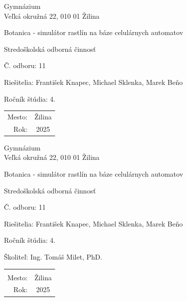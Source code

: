 \documentclass[12pt]{article}
\def\nazovprace{Botanica - simulátor rastlín na báze celulárnych automatov}
\def\autori{František Knapec, Michael Sklenka, Marek Beňo}
\begin{document}
\begin{titlepage}
	\setlength{\parindent}{0pt}

	\begin{center}
		Gymnázium \\
		Veľká okružná 22, 010 01 Žilina

		\vspace{7cm}
		\Huge \nazovprace

		\vspace{1.13cm}
		\Large Stredoškolská odborná činnosť

		\vspace{2.12cm}
		\normalsize Č. odboru: 11
	\end{center}

	\vfill

	\begin{minipage}{0.75\textwidth}
		Riešitelia: \autori \par
		Ročník štúdia: 4.
	\end{minipage}
	\hfill
	\begin{minipage}{0.23\textwidth}
		\hfil %
		\begin{tabular}{rc}
			Mesto: & Žilina \\
			Rok:   & 2025
		\end{tabular}
	\end{minipage}
\end{titlepage}

\begin{titlepage}
	\setlength{\parindent}{0pt}

	\begin{center}
		Gymnázium \\
		Veľká okružná 22, 010 01 Žilina

		\vspace{7cm}
		\Huge \nazovprace

		\vspace{1.13cm}
		\Large Stredoškolská odborná činnosť

		\vspace{2.12cm}
		\normalsize Č. odboru: 11
	\end{center}

	\vfill

	\begin{minipage}{0.75\textwidth}
		Riešitelia: \autori \par
		Ročník štúdia: 4. \par
		Školiteľ: Ing. Tomáš Milet, PhD.\par

	\end{minipage}
	\hfill
	\begin{minipage}{0.23\textwidth}
		\hfil %
		\begin{tabular}{rc}
			\\ \\
			Mesto: & Žilina \\
			Rok:   & 2025
		\end{tabular}
	\end{minipage}
\end{titlepage}
\end{document}
